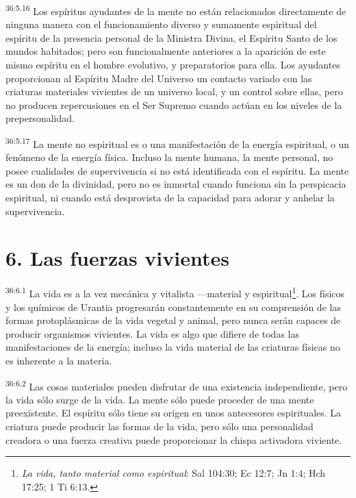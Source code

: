 \par
\textsuperscript{36:5.16} Los espíritus ayudantes de la mente no están relacionados directamente de ninguna manera con el funcionamiento diverso y sumamente espiritual del espíritu de la presencia personal de la Ministra Divina, el Espíritu Santo de los mundos habitados; pero son funcionalmente anteriores a la aparición de este mismo espíritu en el hombre evolutivo, y preparatorios para ella. Los ayudantes proporcionan al Espíritu Madre del Universo un contacto variado con las criaturas materiales vivientes de un universo local, y un control sobre ellas, pero no producen repercusiones en el Ser Supremo cuando actúan en los niveles de la prepersonalidad.

\par
\textsuperscript{36:5.17} La mente no espiritual es o una manifestación de la energía espiritual, o un fenómeno de la energía física. Incluso la mente humana, la mente personal, no posee cualidades de supervivencia si no está identificada con el espíritu. La mente es un don de la divinidad, pero no es inmortal cuando funciona sin la perspicacia espiritual, ni cuando está desprovista de la capacidad para adorar y anhelar la supervivencia.

\section*{6. Las fuerzas vivientes}
\par
\textsuperscript{36:6.1} La vida es a la vez mecánica y vitalista ---material y espiritual\footnote{\textit{La vida, tanto material como espiritual}: Sal 104:30; Ec 12:7; Jn 1:4; Hch 17:25; 1 Ti 6:13.}. Los físicos y los químicos de Urantia progresarán constantemente en su comprensión de las formas protoplásmicas de la vida vegetal y animal, pero nunca serán capaces de producir organismos vivientes. La vida es algo que difiere de todas las manifestaciones de la energía; incluso la vida material de las criaturas físicas no es inherente a la materia.

\par
\textsuperscript{36:6.2} Las cosas materiales pueden disfrutar de una existencia independiente, pero la vida sólo surge de la vida. La mente sólo puede proceder de una mente preexistente. El espíritu sólo tiene su origen en unos antecesores espirituales. La criatura puede producir las formas de la vida, pero sólo una personalidad creadora o una fuerza creativa puede proporcionar la chispa activadora viviente.

